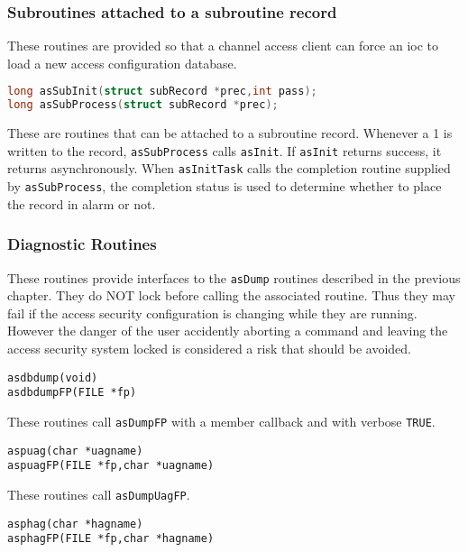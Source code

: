 \subsubsection{Subroutines attached to a subroutine record}

These routines are provided so that a channel access client can force an ioc to load a new access configuration database.

\begin{lstlisting}[language=C]
long asSubInit(struct subRecord *prec,int pass);
long asSubProcess(struct subRecord *prec);
\end{lstlisting}

These are routines that can be attached to a subroutine record.
Whenever a 1 is written to the record, \verb|asSubProcess| calls \verb|asInit|.
If \verb|asInit| returns success, it returns asynchronously.
When \verb|asInitTask| calls the completion routine supplied by \verb|asSubProcess|, the completion status is used to determine whether to place the record in alarm or not.

\subsubsection{Diagnostic Routines}

These routines provide interfaces to the \verb|asDump| routines described in the previous chapter.
They do NOT lock before calling the associated routine.
Thus they may fail if the access security configuration is changing while they are running.
However the danger of the user accidently aborting a command and leaving the access security system locked is considered a risk that should be avoided.

\begin{verbatim}
asdbdump(void)
asdbdumpFP(FILE *fp)
\end{verbatim}

These routines call \verb|asDumpFP| with a member callback and with verbose \verb|TRUE|.

\begin{verbatim}
aspuag(char *uagname)
aspuagFP(FILE *fp,char *uagname)
\end{verbatim}

These routines call \verb|asDumpUagFP|.

\begin{verbatim}
asphag(char *hagname)
asphagFP(FILE *fp,char *hagname)
\end{verbatim}

